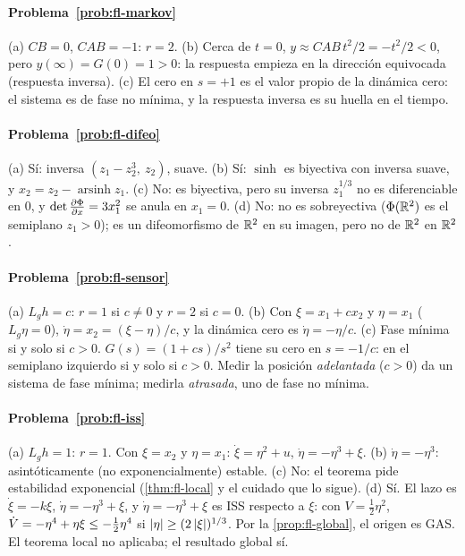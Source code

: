 \paragraph{Problema~\ref{prob:fl-markov}}
(a) $CB=0$, $CAB=-1$: $r=2$. (b) Cerca de $t=0$, $y\approx CAB\,t^2/2=-t^2/2<0$, pero $y(\infty)=G(0)=1>0$: la respuesta empieza en la dirección equivocada (respuesta inversa). (c) El cero en $s=+1$ es el valor propio de la dinámica cero: el sistema es de fase no mínima, y la respuesta inversa es su huella en el tiempo.

\paragraph{Problema~\ref{prob:fl-difeo}}
(a) Sí: inversa $(z_1-z_2^3,\ z_2)$, suave. (b) Sí: $\sinh$ es biyectiva con inversa suave, y $x_2=z_2-\operatorname{arsinh}z_1$. (c) No: es biyectiva, pero su inversa $z_1^{1/3}$ no es diferenciable en $0$, y $\det\frac{\partial \Phi}{\partial x}=3x_1^2$ se anula en $x_1=0$. (d) No: no es sobreyectiva ($\Phi(\mathbb{R}^2)$ es el semiplano $z_1>0$); es un difeomorfismo de $\mathbb{R}^2$ en su imagen, pero no de $\mathbb{R}^2$ en $\mathbb{R}^2$.

\paragraph{Problema~\ref{prob:fl-sensor}}
(a) $L_gh=c$: $r=1$ si $c\neq0$ y $r=2$ si $c=0$. (b) Con $\xi=x_1+cx_2$ y $\eta=x_1$ ($L_g\eta=0$), $\dot\eta=x_2=(\xi-\eta)/c$, y la dinámica cero es $\dot\eta=-\eta/c$. (c) Fase mínima si y solo si $c>0$. $G(s)=(1+cs)/s^2$ tiene su cero en $s=-1/c$: en el semiplano izquierdo si y solo si $c>0$. Medir la posición \emph{adelantada} ($c>0$) da un sistema de fase mínima; medirla \emph{atrasada}, uno de fase no mínima.

\paragraph{Problema~\ref{prob:fl-iss}}
(a) $L_gh=1$: $r=1$. Con $\xi=x_2$ y $\eta=x_1$: $\dot\xi=\eta^2+u$, $\dot\eta=-\eta^3+\xi$. (b) $\dot\eta=-\eta^3$: asintóticamente (no exponencialmente) estable. (c) No: el teorema pide estabilidad exponencial (\cref{thm:fl-local} y el cuidado que lo sigue). (d) Sí. El lazo es $\dot\xi=-k\xi$, $\dot\eta=-\eta^3+\xi$, y $\dot\eta=-\eta^3+\xi$ es ISS respecto a $\xi$: con $V=\tfrac12\eta^2$, $\dot V=-\eta^4+\eta\xi\le-\tfrac12\eta^4$ si $\left\lvert \eta\right\rvert\ge(2\left\lvert \xi\right\rvert)^{1/3}$. Por la \cref{prop:fl-global}, el origen es GAS. El teorema local no aplicaba; el resultado global sí.

